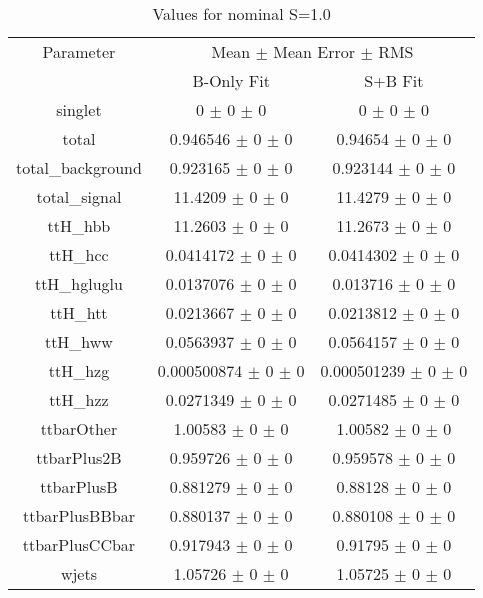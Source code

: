 \begin{table}
\centering
\caption{Values for nominal S=1.0}
\begin{tabular}{ccc}
\toprule
Parameter 	& \multicolumn{2}{c}{Mean $\pm$ Mean Error $\pm$ RMS}\\
 	& B-Only Fit & S+B Fit\\
\midrule
singlet 	& \num{0} $\pm$ \num{0} $\pm$ \num{0} 	& \num{0} $\pm$ \num{0} $\pm$ \num{0}\\
total 	& \num{0.946546} $\pm$ \num{0} $\pm$ \num{0} 	& \num{0.94654} $\pm$ \num{0} $\pm$ \num{0}\\
total\_background 	& \num{0.923165} $\pm$ \num{0} $\pm$ \num{0} 	& \num{0.923144} $\pm$ \num{0} $\pm$ \num{0}\\
total\_signal 	& \num{11.4209} $\pm$ \num{0} $\pm$ \num{0} 	& \num{11.4279} $\pm$ \num{0} $\pm$ \num{0}\\
ttH\_hbb 	& \num{11.2603} $\pm$ \num{0} $\pm$ \num{0} 	& \num{11.2673} $\pm$ \num{0} $\pm$ \num{0}\\
ttH\_hcc 	& \num{0.0414172} $\pm$ \num{0} $\pm$ \num{0} 	& \num{0.0414302} $\pm$ \num{0} $\pm$ \num{0}\\
ttH\_hgluglu 	& \num{0.0137076} $\pm$ \num{0} $\pm$ \num{0} 	& \num{0.013716} $\pm$ \num{0} $\pm$ \num{0}\\
ttH\_htt 	& \num{0.0213667} $\pm$ \num{0} $\pm$ \num{0} 	& \num{0.0213812} $\pm$ \num{0} $\pm$ \num{0}\\
ttH\_hww 	& \num{0.0563937} $\pm$ \num{0} $\pm$ \num{0} 	& \num{0.0564157} $\pm$ \num{0} $\pm$ \num{0}\\
ttH\_hzg 	& \num{0.000500874} $\pm$ \num{0} $\pm$ \num{0} 	& \num{0.000501239} $\pm$ \num{0} $\pm$ \num{0}\\
ttH\_hzz 	& \num{0.0271349} $\pm$ \num{0} $\pm$ \num{0} 	& \num{0.0271485} $\pm$ \num{0} $\pm$ \num{0}\\
ttbarOther 	& \num{1.00583} $\pm$ \num{0} $\pm$ \num{0} 	& \num{1.00582} $\pm$ \num{0} $\pm$ \num{0}\\
ttbarPlus2B 	& \num{0.959726} $\pm$ \num{0} $\pm$ \num{0} 	& \num{0.959578} $\pm$ \num{0} $\pm$ \num{0}\\
ttbarPlusB 	& \num{0.881279} $\pm$ \num{0} $\pm$ \num{0} 	& \num{0.88128} $\pm$ \num{0} $\pm$ \num{0}\\
ttbarPlusBBbar 	& \num{0.880137} $\pm$ \num{0} $\pm$ \num{0} 	& \num{0.880108} $\pm$ \num{0} $\pm$ \num{0}\\
ttbarPlusCCbar 	& \num{0.917943} $\pm$ \num{0} $\pm$ \num{0} 	& \num{0.91795} $\pm$ \num{0} $\pm$ \num{0}\\
wjets 	& \num{1.05726} $\pm$ \num{0} $\pm$ \num{0} 	& \num{1.05725} $\pm$ \num{0} $\pm$ \num{0}\\
\bottomrule
\end{tabular}
\end{table}